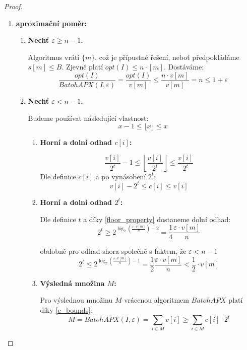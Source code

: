 \documentclass[11pt]{report} %
\numberwithin{equation}{section}
\begin{document}
\begin{proof}~
\begin{enumerate}
\item \textbf{aproximační poměr:}
\begin{enumerate}
	\item \textbf{Nechť $\varepsilon \geq n-1$.}
	
	Algoritmus vrátí $\{m\}$, což je přípustné řešení, neboť předpokládáme $s[m] \leq B$. Zjevně platí $opt(I) \leq n \cdot [m]$. Dostáváme:
	$$\frac{opt(I)}{BatohAPX(I,\varepsilon)} = \frac{opt(I)}{v[m]} \leq \frac{n \cdot v[m]}{v[m]} = n \leq 1+\varepsilon$$
	
	\item \textbf{Nechť $\varepsilon < n-1$.}
	
	Budeme používat následující vlastnost: 
	\begin{equation}
	\label{floor_property}
	x - 1 \leq \lfloor x \rfloor \leq x
	\end{equation}
	
	\begin{enumerate}
		\item \textbf{Horní a dolní odhad $c[i]$:}
		
		$$\frac{v[i]}{2^t} - 1 \leq \left\lfloor \frac{v[i]}{2^t} \right\rfloor \leq \frac{v[i]}{2^t}$$
		Dle definice $c[i]$ a po vynásobení $2^t$:
		\begin{equation}
		\label{c_bounds}
		v[i] - 2^t \leq c[i] \leq v[i]
		\end{equation}
		
		\item \textbf{Horní a dolní odhad $2^t$:}
		
		Dle definice $t$ a díky \ref{floor_property} dostaneme dolní odhad:
		\begin{equation}
			\label{2t_bottom}
			2^t \geq 2^{\log_2(\frac{\varepsilon \cdot v[m]}{n}) - 2} = \frac{1}{4} \frac{\varepsilon \cdot v[m]}{n}
		\end{equation}
		
		obdobně pro odhad shora společně s faktem, že $\varepsilon < n-1$		
		\begin{equation}
		\label{2t_upper}
		2^t \leq 2^{\log_2(\frac{\varepsilon \cdot v[m]}{n}) - 1} = \frac{1}{2} \frac{\varepsilon \cdot v[m]}{n} < \frac{1}{2} \cdot v[m]
		\end{equation}
		
		\item \textbf{Výsledná množina $M$:}
		
		Pro výslednou množinu $M$ vrácenou algoritmem $BatohAPX$ platí díky \ref{c_bounds}:
		\begin{equation*}
			M = BatohAPX(I, \varepsilon) = \sum\limits_{i\in M} v[i] \geq \sum\limits_{i\in M} c[i] \cdot 2^t
		\end{equation*}
		

\end{enumerate}
\end{enumerate}
\end{enumerate}
\end{proof}
\end{document}
